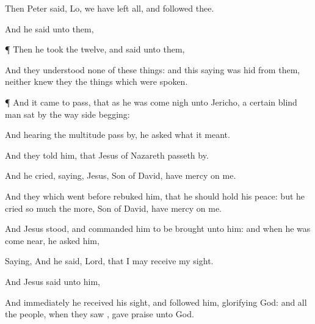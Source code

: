{Then
Peter
said,
Lo,
we have
left
all,
and
followed
thee.

And he
said unto
them,
{}



\par }{\PP {}¶
Then he
took
{} the
twelve, and
said
unto
them,
{}



And
they
understood
none of these
things:
and
this
saying
was
hid
from
them,
neither knew
they the things
which were
spoken.


\par }{\PP {}¶
And it came to
pass, that
as
he was come
nigh
unto
Jericho, a
certain blind
man
sat
by the way
side
begging:

And
hearing the
multitude pass
by, he
asked
what
it
meant.

And they
told
him,
that
Jesus of
Nazareth passeth
by.

And he
cried,
saying,
Jesus,
{}
Son of
David, have
mercy on
me.

And they
which went
before
rebuked
him,
that he should
hold
his
peace:
but he
cried so
much the
more,
{}
Son of
David, have
mercy on
me.

And
Jesus
stood, and
commanded
him to be
brought
unto
him: and
when
he was come
near, he
asked
him,

Saying,
{}
And he
said,
Lord,
that I may receive my
sight.

And
Jesus
said unto
him,
{}

And
immediately he received his
sight,
and
followed
him,
glorifying
God:
and
all the
people, when they
saw
{},
gave
praise unto
God.




}
